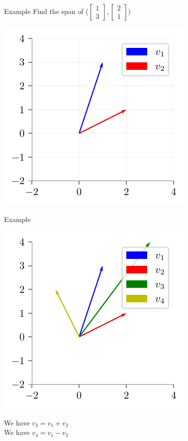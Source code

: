 \documentclass{beamer}
\begin{document}
\begin{frame}{Example}
Find the span of ($\begin{bmatrix}
1 \\3
\end{bmatrix}, \begin{bmatrix}
2 \\1
\end{bmatrix}) $

\includegraphics{../assets/linear-regression/figures/geoemetric-span-1.pdf}



\end{frame}

\begin{frame}{Example}

    \includegraphics{../assets/linear-regression/figures/geoemetric-span-2.pdf}

    We have $v_3 = v_1 + v_2$ \\
    We have $v_4 = v_1 - v_2$ \\


\end{frame}
\end{document}
